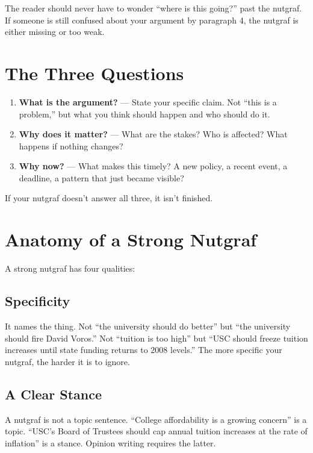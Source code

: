 \documentclass[12pt]{article}
\begin{document}
The reader should never have to wonder ``where is this going?'' past the nutgraf. If someone is still confused about your argument by paragraph 4, the nutgraf is either missing or too weak.

\section*{The Three Questions}

\begin{tipbox}
\begin{enumerate}[leftmargin=*]
    \item \textbf{What is the argument?} --- State your specific claim. Not ``this is a problem,'' but what you think should happen and who should do it.
    \item \textbf{Why does it matter?} --- What are the stakes? Who is affected? What happens if nothing changes?
    \item \textbf{Why now?} --- What makes this timely? A new policy, a recent event, a deadline, a pattern that just became visible?
\end{enumerate}
If your nutgraf doesn't answer all three, it isn't finished.
\end{tipbox}

\section*{Anatomy of a Strong Nutgraf}

A strong nutgraf has four qualities:

\subsection*{Specificity}
It names the thing. Not ``the university should do better'' but ``the university should fire David Voros.'' Not ``tuition is too high'' but ``USC should freeze tuition increases until state funding returns to 2008 levels.'' The more specific your nutgraf, the harder it is to ignore.

\subsection*{A Clear Stance}
A nutgraf is not a topic sentence. ``College affordability is a growing concern'' is a topic. ``USC's Board of Trustees should cap annual tuition increases at the rate of inflation'' is a stance. Opinion writing requires the latter.
\end{document}
